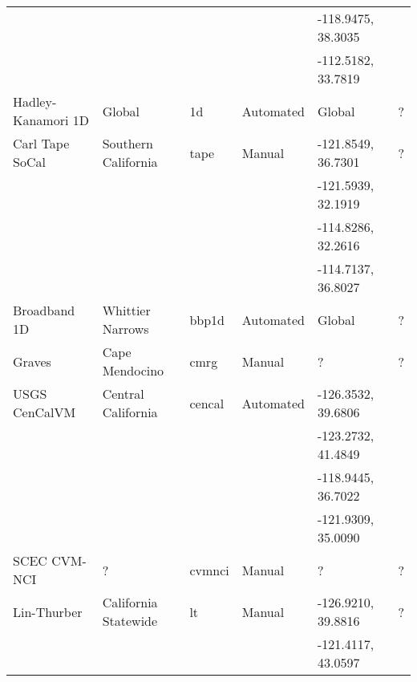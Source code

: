 \begin{table*}[ht!]
\begin{tabular}[]{lllllp{1.25in}}
                   &                       &               &              & -118.9475, 38.3035 &                              \\
                   &                       &               &              & -112.5182, 33.7819 &                              \\
Hadley-Kanamori 1D & Global                & 1d            &  Automated   & Global             & ?                            \\
Carl Tape SoCal    & Southern California   & tape          &  Manual      & -121.8549, 36.7301 & ?	                      \\
                   &                       &               &              & -121.5939, 32.1919 &                              \\
                   &                       &               &              & -114.8286, 32.2616 &                              \\
                   &                       &               &              & -114.7137, 36.8027 &                              \\
Broadband 1D       & Whittier Narrows      & bbp1d         &  Automated   & Global             & ?                            \\
Graves             & Cape Mendocino        & cmrg          &  Manual      & ?                  & ?                            \\
USGS CenCalVM      & Central California    & cencal        &  Automated   & -126.3532, 39.6806 & \citet{Brocher_2005_Tech}    \\
                   &                       &               &              & -123.2732, 41.4849 & \citet{Brocher_2006_Proc}    \\
                   &                       &               &              & -118.9445, 36.7022 &                              \\
                   &                       &               &              & -121.9309, 35.0090 &                              \\
SCEC CVM-NCI       & ?                     & cvmnci        &  Manual      & ?                  & ?                            \\
Lin-Thurber        & California Statewide  & lt            &  Manual      & -126.9210, 39.8816 & ?                            \\
                   &                       &               &              & -121.4117, 43.0597 &                              \\

\end{tabular}
\end{table*}
